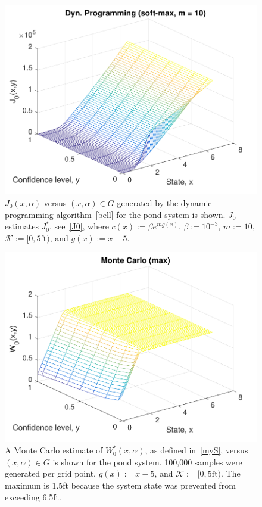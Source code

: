 \documentclass[letterpaper, 10 pt, conference]{ieeeconf}  %
\begin{document}
\begin{figure}[thpb]
      \centering
      \includegraphics[scale=0.5]{dyn_prog_J0_sept112018.pdf}
      \caption{$J_0(x,\alpha)$ versus $(x, \alpha) \in G$ generated by the dynamic programming algorithm~\eqref{bell} for the pond system is shown.
	  $J_0$ estimates $J_0^*$, see~\eqref{J0}, where $c(x) := \beta e^{m g(x)}$, $\beta := 10^{-3}$, $m := 10$, $\mathcal{K} := [0, 5\text{ft})$, and $g(x) := x-5$.}
      \label{J0dp}
\end{figure}

\begin{figure}[thpb]
      \centering
      \includegraphics[scale=0.5]{monte_carlo_max_sept112018.pdf}
      \caption{A Monte Carlo estimate of $W_0^*(x,\alpha)$, as defined in~\eqref{myS}, versus $(x, \alpha) \in G$ is shown for the pond system.
	  100,000 samples were generated per grid point, $g(x) := x - 5$, and $\mathcal{K} := [0, 5\text{ft})$. 
	  The maximum is 1.5ft because the system state was prevented from exceeding 6.5ft.}
      \label{W0mc}
\end{figure}
\end{document}
